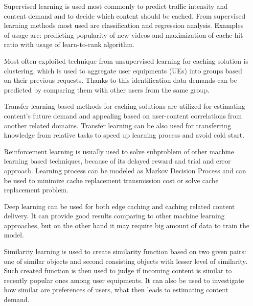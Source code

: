 \documentclass[conference]{IEEEtran}
\begin{document}
Supervised learning is used most commonly to predict traffic intensity and content demand and to decide which content should be cached. From supervised learning methods most used are classification and regression analysis\cite{cache1}. Examples of usage are: predicting popularity of new videos and maximization of cache hit ratio with usage of learn-to-rank algorithm\cite{cache3}.\par
Most often exploited technique from unsupervised learning for caching solution is clustering, which is used to aggregate user equipments (UEs) into groups based on their previous requests. Thanks to this identification data demands can be predicted by comparing them with other users from the same group\cite{cache1}.\par
Transfer learning based methods for caching solutions are utilized for estimating content's future demand and appealing based on user-content correlations from another related domains\cite{cache1}. Transfer learning can be also used for transferring knowledge from relative tasks to speed up learning process and avoid cold start\cite{cache3}.\par
Reinforcement learning is usually used to solve subproblem of other machine learning based techniques, because of its delayed reward and trial and error approach. Learning process can be modeled as Markov Decision Process and can be used to minimize cache replacement transmission cost or solve cache replacement problem\cite{cache3}.\par
Deep learning can be used for both edge caching and caching related content delivery. It can provide good results comparing to other machine learning approaches, but on the other hand it may require big amount of data to train the model\cite{cache1}.\par
Similarity learning is used to create similarity function based on two given pairs: one of similar objects and second consisting objects with lesser level of similarity. Such created function is then used to judge if incoming content is similar to recently popular ones among user equipments\cite{cache1}. It can also be used to investigate how similar are preferences of users, what then leads to estimating content demand.\par
\end{document}

